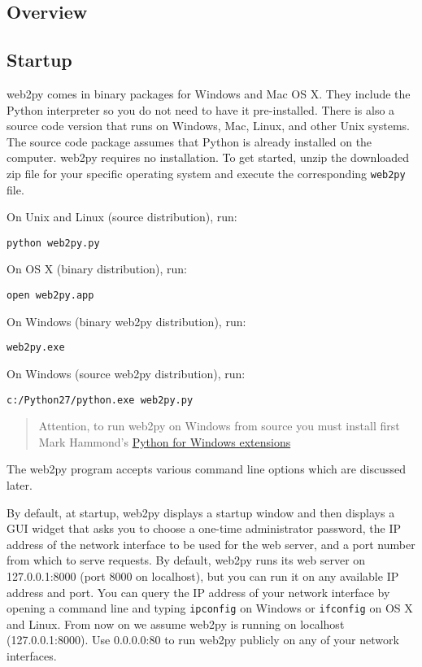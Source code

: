 \documentclass[justified,sixbynine,notoc]{tufte-book}
\def\ft{\small\tt}
\def\inxx#1{\index{#1}}
\begin{document}
\begin{fullwidth}
\goodbreak\chapter{Overview}

\goodbreak\section{Startup}

\inxx{Linux} \inxx{Mac} \inxx{Windows}
\noindent web2py comes in binary packages for Windows and Mac OS X. They include the Python interpreter so you do not need to have it pre-installed. There is also a source code version that runs on Windows, Mac, Linux, and other Unix systems. The source code package assumes that Python is already installed on the computer.
\noindent web2py requires no installation. To get started, unzip the downloaded zip file for your specific operating system and execute the corresponding {\ft web2py} file.

On Unix and Linux (source distribution), run:
\begin{lstlisting}
python web2py.py
\end{lstlisting}

On OS X (binary distribution), run:
\begin{lstlisting}
open web2py.app
\end{lstlisting}

On Windows (binary web2py distribution), run:
\begin{lstlisting}
web2py.exe
\end{lstlisting}

On Windows (source web2py distribution), run:
\begin{lstlisting}
c:/Python27/python.exe web2py.py
\end{lstlisting}

\begin{quote}Attention, to run web2py on Windows from source you must install first Mark Hammond's {\footnotesize\href{http://sourceforge.net/projects/pywin32/}{Python for Windows extensions}}\end{quote}
The web2py program accepts various command line options which are discussed later.

By default, at startup, web2py displays a startup window and then displays a GUI widget that asks you to choose a one-time administrator password, the IP address of the network interface to be used for the web server, and a port number from which to serve requests. By default, web2py runs its web server on 127.0.0.1:8000 (port 8000 on localhost), but you can run it on any available IP address and port. You can query the IP address of your network interface by opening a command line and typing {\ft ipconfig} on Windows or {\ft ifconfig} on OS X and Linux. From now on we assume web2py is running on localhost (127.0.0.1:8000). Use 0.0.0.0:80 to run web2py publicly on any of your network interfaces.



\end{fullwidth}
\end{document}
